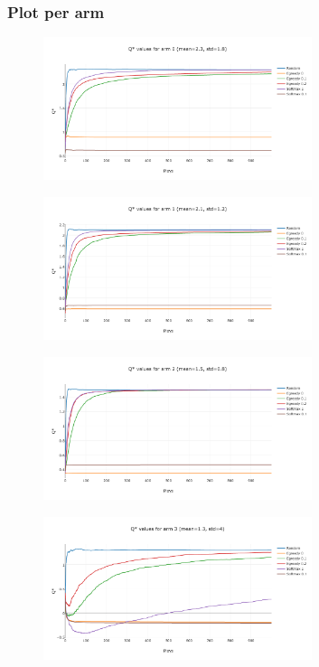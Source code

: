 \documentclass[11pt]{article}
\begin{document}
\subsubsection{Plot per arm}

\begin{figure}[H]
   \centering
   \includegraphics[width=0.7\textwidth]{img/1-2/q1.png}
\end{figure}

\begin{figure}[H]
   \centering
   \includegraphics[width=0.7\textwidth]{img/1-2/q2.png}
\end{figure}

\begin{figure}[H]
   \centering
   \includegraphics[width=0.7\textwidth]{img/1-2/q3.png}
\end{figure}


\begin{figure}[H]
   \centering
   \includegraphics[width=0.7\textwidth]{img/1-2/q4.png}
\end{figure}
\end{document}
